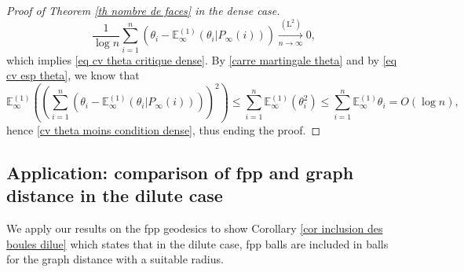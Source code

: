 \documentclass[11pt]{article}
\numberwithin{equation}{section}
\def\E{\mathbb{E}}
\begin{document}
\begin{proof}[Proof of Theorem \ref{th nombre de faces} in the dense case]
\begin{equation}\label{cv theta moins condition dense}
	\frac{1}{\log n}\sum_{i=1}^n \left( \theta_i -\E^{(1)}_\infty(\theta_i \vert P_\infty(i))\right)
	\mathop{\longrightarrow}\limits_{n\to \infty}^{(\mathrm{L}^2)}
	0,
\end{equation}
which implies \eqref{eq cv theta critique dense}. By \eqref{carre martingale theta} and by \eqref{eq cv esp theta}, we know that
$$
\E^{(1)}_\infty \left(
\left(\sum_{i=1}^n \left(
\theta_i-\E^{(1)}_\infty(\theta_i \vert P_\infty(i))
\right)
\right)^2
\right)  \le \sum_{i=1}^n \E^{(1)}_\infty (\theta_i^2) \le  \sum_{i=1}^n \E^{(1)}_\infty \theta_i = O(\log n),
$$
hence \eqref{cv theta moins condition dense}, thus ending the proof.
\end{proof}


\subsection{Application: comparison of fpp and graph distance in the dilute case}
We apply our results on the fpp geodesics to show Corollary \ref{cor inclusion des boules dilue} which states that in the dilute case, fpp balls are included in balls for the graph distance with a suitable radius.
\end{document}
